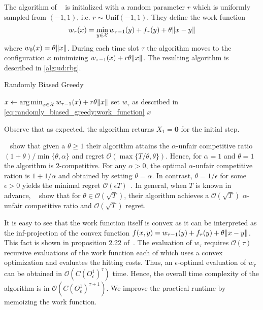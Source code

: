 The algorithm of \citeauthor*{Andrew2015}~\cite{Andrew2015} is initialized with a random parameter $r$ which is uniformly sampled from $({-1,1})$, i.e. $r \sim \text{Unif}(-1, 1)$. They define the work function \begin{align}\label{eq:randomly_biased_greedy:work_function}
    w_{\tau}(x) = \min_{y \in \mathcal{X}} w_{\tau-1}(y) + f_{\tau}(y) + \theta \lVert x - y\rVert
\end{align} where $w_0(x) = \theta \lVert x\rVert$. During each time slot $\tau$ the algorithm moves to the configuration $x$ minimizing $w_{\tau-1}(x) + r \theta \lVert x\rVert$. The resulting algorithm is described in \cref{alg:ud:rbg}.

\begin{algorithm}
    \caption{Randomly Biased Greedy~\cite{Andrew2015}}\label{alg:ud:rbg}
    $x \gets \operatorname*{arg\,min}_{x \in \mathcal{X}} w_{\tau-1}(x) + r \theta \lVert x\rVert$\;
    set $w_{\tau}$ as described in \cref{eq:randomly_biased_greedy:work_function}\;
    \Return $x$\;
\end{algorithm}

Observe that as expected, the algorithm returns $X_1 = \mathbf{0}$ for the initial step.

\citeauthor*{Andrew2015}~\cite{Andrew2015} show that given a $\theta \geq 1$ their algorithm attains the $\alpha$-unfair competitive ratio $(1+\theta) / \min \{\theta, \alpha\}$ and regret $\mathcal{O}(\max \{T / \theta, \theta\})$. Hence, for $\alpha = 1$ and $\theta = 1$ the algorithm is $2$-competitive. For any $\alpha > 0$, the optimal $\alpha$-unfair competitive ration is $1 + 1 / \alpha$ and obtained by setting $\theta = \alpha$. In contrast, $\theta = 1 / \epsilon$ for some $\epsilon > 0$ yields the minimal regret $\mathcal{O}(\epsilon T)$~\cite{Andrew2015}. In general, when $T$ is known in advance, \citeauthor*{Andrew2015}~\cite{Andrew2015} show that for $\theta \in \mathcal{O}(\sqrt{T})$, their algorithm achieves a $\mathcal{O}(\sqrt{T})$ $\alpha$-unfair competitive ratio and $\mathcal{O}(\sqrt{T})$ regret.

It is easy to see that the work function itself is convex as it can be interpreted as the inf-projection of the convex function $f(x,y) = w_{\tau-1}(y) + f_{\tau}(y) + \theta \lVert x - y\rVert$. This fact is shown in proposition 2.22 of~\cite{Burke2015}. The evaluation of $w_{\tau}$ requires $\mathcal{O}(\tau)$ recursive evaluations of the work function each of which uses a convex optimization and evaluates the hitting costs. Thus, an $\epsilon$-optimal evaluation of $w_{\tau}$ can be obtained in $\mathcal{O}(C (O_{\epsilon}^1)^{\tau})$ time. Hence, the overall time complexity of the algorithm is in $\mathcal{O}(C (O_{\epsilon}^1)^{\tau+1})$. We improve the practical runtime by memoizing the work function.

